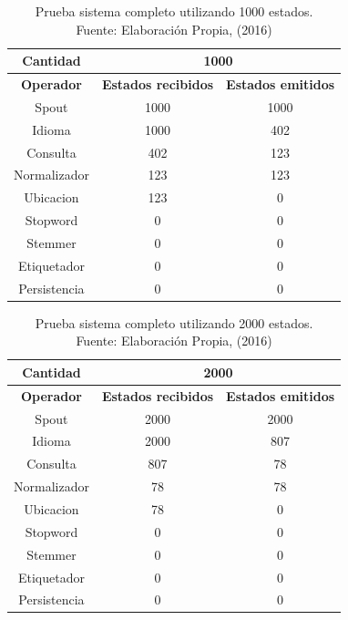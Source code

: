 \begin{table}[H]
\centering
\caption[Prueba sistema completo utilizando 1000 estados.]{Prueba sistema completo utilizando 1000 estados.\\Fuente: Elaboración Propia, (2016)}
\label{PruebaSistFull1000}
\begin{tabular}{|c|c|c|}
\hline
\textbf{Cantidad} & \multicolumn{2}{c|}{\textbf{1000}} \\ \hline
\textbf{Operador} & \multicolumn{1}{c|}{\textbf{Estados recibidos}} & \multicolumn{1}{c|}{\textbf{Estados emitidos}} \\ \hline
Spout & 1000 & 1000 \\ \hline
Idioma & 1000 & 402 \\ \hline
Consulta & 402 & 123 \\ \hline
Normalizador & 123 & 123 \\ \hline
Ubicacion & 123 & 0 \\ \hline
Stopword & 0 & 0 \\ \hline
Stemmer & 0 & 0 \\ \hline
Etiquetador & 0 & 0 \\ \hline
Persistencia & 0 & 0 \\ \hline
\end{tabular}
\end{table}

\begin{table}[H]
\centering
\caption[Prueba sistema completo utilizando 2000 estados.]{Prueba sistema completo utilizando 2000 estados.\\Fuente: Elaboración Propia, (2016)}
\label{PruebaSistFull2000}
\begin{tabular}{|c|c|c|}
\hline
\textbf{Cantidad} & \multicolumn{2}{c|}{\textbf{2000}} \\ \hline
\textbf{Operador} & \multicolumn{1}{c|}{\textbf{Estados recibidos}} & \multicolumn{1}{c|}{\textbf{Estados emitidos}} \\ \hline
Spout & 2000 & 2000 \\ \hline
Idioma & 2000 & 807 \\ \hline
Consulta & 807 & 78 \\ \hline
Normalizador & 78 & 78 \\ \hline
Ubicacion & 78 & 0 \\ \hline
Stopword & 0 & 0 \\ \hline
Stemmer & 0 & 0 \\ \hline
Etiquetador & 0 & 0 \\ \hline
Persistencia & 0 & 0 \\ \hline
\end{tabular}
\end{table}

